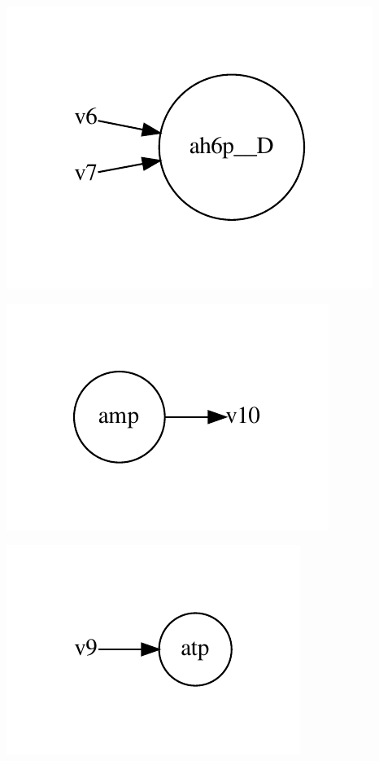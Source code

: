 \documentclass{scrartcl}
\begin{document}
\begin{minipage}{0.33\linewidth}
\includegraphics[max width=\linewidth]{metabolic_maps/ah6p__D.pdf}
\end{minipage}
\begin{minipage}{0.33\linewidth}
\includegraphics[max width=\linewidth]{metabolic_maps/amp.pdf}
\end{minipage}
\begin{minipage}{0.33\linewidth}
\includegraphics[max width=\linewidth]{metabolic_maps/atp.pdf}
\end{minipage}
\end{document}
